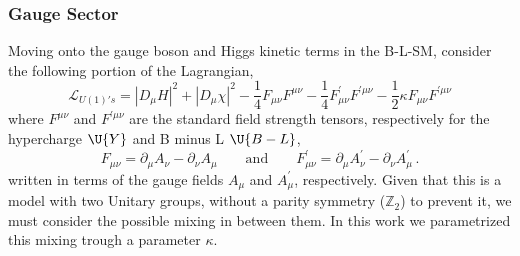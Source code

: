 \subsubsection{Gauge Sector}

Moving onto the gauge boson and Higgs kinetic terms in the B-L-SM, consider the following portion of the Lagrangian,
\begin{equation}
\mathcal{L}_{U(1)'s} =  \left| D_\mu H \right|^2 + \left| D_\mu \chi \right|^2 -\dfrac{1}{4} F_{\mu \nu} F^{\mu \nu} -\dfrac{1}{4} F^\prime_{\mu \nu} F^{\prime \mu \nu} -\dfrac{1}{2} \kappa F_{\mu \nu} F^{\prime \mu \nu}
\label{eq:Lu1}
\end{equation}
where $F^{\mu \nu}$ and $F^{\prime \mu \nu}$ are the standard field strength tensors, respectively for the hypercharge $\U{Y}$ and B minus L $\U{B-L}$, 
\begin{equation}
	F_{\mu \nu} = \partial_\mu A_\nu - \partial_\nu A_\mu 
	\qquad
	\text{and}
	\qquad
	 F^\prime_{\mu \nu} = \partial_\mu A^\prime_\nu - \partial_\nu A^\prime_\mu\,.
	 \label{eq:Fmn}
\end{equation}
written in terms of the gauge fields $A_\mu$ and $A_\mu^\prime$, respectively. Given that this is a model with two Unitary groups, without a parity symmetry ($\mathbb{Z}_2$) to prevent it, we must consider the possible mixing in between them. In this work we parametrized this mixing trough a parameter $\kappa$.

